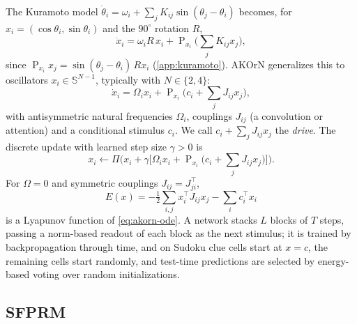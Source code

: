 \documentclass{article}
\theoremstyle{plain}
\theoremstyle{definition}
\theoremstyle{remark}
\newcommand{\Sph}{\mathbb{S}}
\newcommand{\Proj}{\operatorname{P}}
\newcommand{\Ret}{\Pi}
\begin{document}
The Kuramoto model $\dot\theta_i=\omega_i+\sum_jK_{ij}\sin(\theta_j-\theta_i)$ becomes, for
$x_i=(\cos\theta_i,\sin\theta_i)$ and the $90^\circ$ rotation $R$,
\begin{equation}
  \dot x_i = \omega_i R\,x_i + \Proj_{x_i}\Big(\sum_j K_{ij}x_j\Big),
  \label{eq:kuramoto-vector}
\end{equation}
since $\Proj_{x_i}x_j=\sin(\theta_j-\theta_i)\,Rx_i$ (\cref{app:kuramoto}). AKOrN
\citep{miyato2025akorn} generalizes this to oscillators $x_i\in\Sph^{N-1}$, typically with $N\in\{2,4\}$:
\begin{equation}
  \dot x_i = \Omega_i x_i + \Proj_{x_i}\Big(c_i + \sum_j J_{ij} x_j\Big),
  \label{eq:akorn-ode}
\end{equation}
with antisymmetric natural frequencies $\Omega_i$, couplings $J_{ij}$ (a convolution or attention) and
a conditional stimulus $c_i$. We call $c_i+\sum_jJ_{ij}x_j$ the \emph{drive}. The discrete update with
learned step size $\gamma>0$ is
\begin{equation}
  x_i \leftarrow \Ret\Big(x_i + \gamma\Big[\Omega_i x_i + \Proj_{x_i}\Big(c_i + \sum_j J_{ij}x_j\Big)\Big]\Big).
  \label{eq:akorn-step}
\end{equation}
For $\Omega=0$ and symmetric couplings $J_{ij}=J_{ji}^\top$,
\begin{equation}
  E(x) = -\tfrac12\textstyle\sum_{i,j} x_i^\top J_{ij} x_j - \sum_i c_i^\top x_i
  \label{eq:akorn-energy}
\end{equation}
is a Lyapunov function of \eqref{eq:akorn-ode}. A network stacks $L$ blocks of $T$ steps, passing a
norm-based readout of each block as the next stimulus; it is trained by backpropagation through
time, and on Sudoku clue cells start at $x=c$, the remaining cells start randomly, and test-time
predictions are selected by energy-based voting over random initializations.

\subsection{SFPRM}
\label{sec:sfprm}
\end{document}
